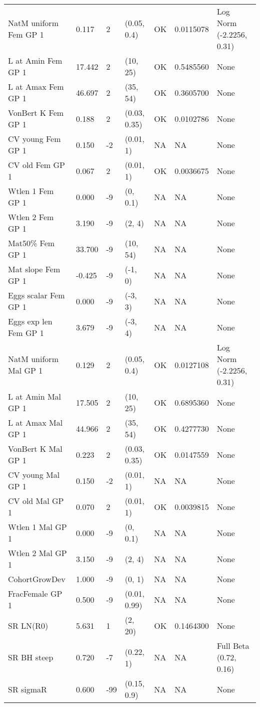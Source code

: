 \documentclass[11pt,
  english,
  letterpaper,
]{article}
\begin{document}
\begin{landscape}
\begin{longtable}[t]{>{\raggedright\arraybackslash}p{7cm}lllll>{\raggedright\arraybackslash}p{4cm}}
\endfoot
\bottomrule
\endlastfoot
NatM uniform Fem GP 1 & 0.117 & 2 & (0.05, 0.4) & OK & 0.0115078 & Log Norm (-2.2256, 0.31)\\
L at Amin Fem GP 1 & 17.442 & 2 & (10, 25) & OK & 0.5485560 & None\\
L at Amax Fem GP 1 & 46.697 & 2 & (35, 54) & OK & 0.3605700 & None\\
VonBert K Fem GP 1 & 0.188 & 2 & (0.03, 0.35) & OK & 0.0102786 & None\\
CV young Fem GP 1 & 0.150 & -2 & (0.01, 1) & NA & NA & None\\
CV old Fem GP 1 & 0.067 & 2 & (0.01, 1) & OK & 0.0036675 & None\\
Wtlen 1 Fem GP 1 & 0.000 & -9 & (0, 0.1) & NA & NA & None\\
Wtlen 2 Fem GP 1 & 3.190 & -9 & (2, 4) & NA & NA & None\\
Mat50\% Fem GP 1 & 33.700 & -9 & (10, 54) & NA & NA & None\\
Mat slope Fem GP 1 & -0.425 & -9 & (-1, 0) & NA & NA & None\\
Eggs scalar Fem GP 1 & 0.000 & -9 & (-3, 3) & NA & NA & None\\
Eggs exp len Fem GP 1 & 3.679 & -9 & (-3, 4) & NA & NA & None\\
NatM uniform Mal GP 1 & 0.129 & 2 & (0.05, 0.4) & OK & 0.0127108 & Log Norm (-2.2256, 0.31)\\
L at Amin Mal GP 1 & 17.505 & 2 & (10, 25) & OK & 0.6895360 & None\\
L at Amax Mal GP 1 & 44.966 & 2 & (35, 54) & OK & 0.4277730 & None\\
VonBert K Mal GP 1 & 0.223 & 2 & (0.03, 0.35) & OK & 0.0147559 & None\\
CV young Mal GP 1 & 0.150 & -2 & (0.01, 1) & NA & NA & None\\
CV old Mal GP 1 & 0.070 & 2 & (0.01, 1) & OK & 0.0039815 & None\\
Wtlen 1 Mal GP 1 & 0.000 & -9 & (0, 0.1) & NA & NA & None\\
Wtlen 2 Mal GP 1 & 3.150 & -9 & (2, 4) & NA & NA & None\\
CohortGrowDev & 1.000 & -9 & (0, 1) & NA & NA & None\\
FracFemale GP 1 & 0.500 & -9 & (0.01, 0.99) & NA & NA & None\\
SR LN(R0) & 5.631 & 1 & (2, 20) & OK & 0.1464300 & None\\
SR BH steep & 0.720 & -7 & (0.22, 1) & NA & NA & Full Beta (0.72, 0.16)\\
SR sigmaR & 0.600 & -99 & (0.15, 0.9) & NA & NA & None\\

\end{longtable}
\end{landscape}
\end{document}
